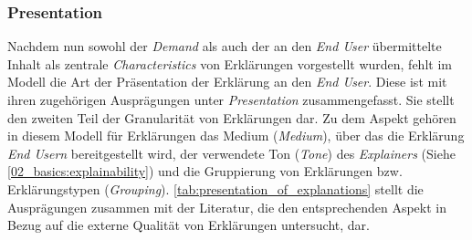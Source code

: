 \subsubsection{Presentation}

Nachdem nun sowohl der \textit{Demand} als auch der an den \textit{End User} übermittelte Inhalt als zentrale \textit{Characteristics} von Erklärungen vorgestellt wurden, fehlt im Modell die Art der Präsentation der Erklärung an den \textit{End User}. Diese ist mit ihren zugehörigen Ausprägungen unter \textit{Presentation} zusammengefasst. Sie stellt den zweiten Teil der Granularität von Erklärungen dar. Zu dem Aspekt gehören in diesem Modell für Erklärungen das Medium (\textit{Medium}), über das die Erklärung \textit{End Usern} bereitgestellt wird, der verwendete Ton (\textit{Tone}) des \textit{Explainers} (Siehe \autoref{02_basics:explainability}) \cite[vgl.][]{chazette_knowledge_nodate} und die Gruppierung von Erklärungen bzw. Erklärungstypen (\textit{Grouping}). \autoref{tab:presentation_of_explanations} stellt die Ausprägungen zusammen mit der Literatur, die den entsprechenden Aspekt in Bezug auf die externe Qualität von Erklärungen untersucht, dar.

